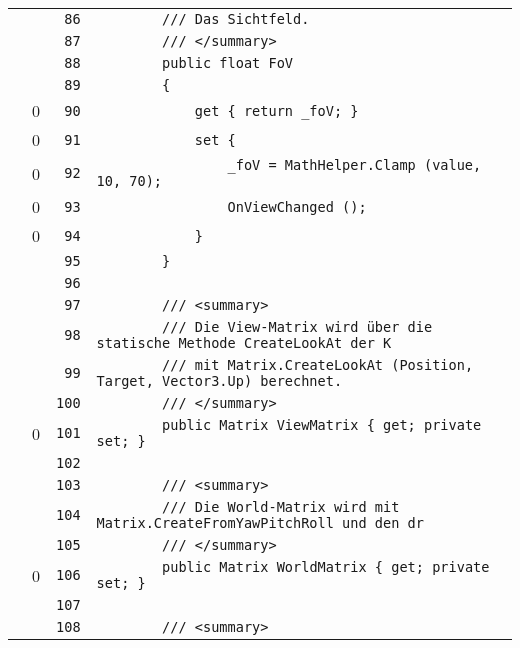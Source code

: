\documentclass[a4paper,10pt]{article}
\begin{document}
\begin{longtable}[l]{lrrl}
\cellcolor{gray} &  & \verb~86~ & \verb~        /// Das Sichtfeld.~\\
\cellcolor{gray} &  & \verb~87~ & \verb~        /// </summary>~\\
\cellcolor{gray} &  & \verb~88~ & \verb~        public float FoV~\\
\cellcolor{gray} &  & \verb~89~ & \verb~        {~\\
\cellcolor{red} & 0 & \verb~90~ & \verb~            get { return _foV; }~\\
\cellcolor{red} & 0 & \verb~91~ & \verb~            set {~\\
\cellcolor{red} & 0 & \verb~92~ & \verb~                _foV = MathHelper.Clamp (value, 10, 70);~\\
\cellcolor{red} & 0 & \verb~93~ & \verb~                OnViewChanged ();~\\
\cellcolor{red} & 0 & \verb~94~ & \verb~            }~\\
\cellcolor{gray} &  & \verb~95~ & \verb~        }~\\
\cellcolor{gray} &  & \verb~96~ & \verb~~\\
\cellcolor{gray} &  & \verb~97~ & \verb~        /// <summary>~\\
\cellcolor{gray} &  & \verb~98~ & \verb~        /// Die View-Matrix wird über die statische Methode CreateLookAt der K~\\
\cellcolor{gray} &  & \verb~99~ & \verb~        /// mit Matrix.CreateLookAt (Position, Target, Vector3.Up) berechnet.~\\
\cellcolor{gray} &  & \verb~100~ & \verb~        /// </summary>~\\
\cellcolor{red} & 0 & \verb~101~ & \verb~        public Matrix ViewMatrix { get; private set; }~\\
\cellcolor{gray} &  & \verb~102~ & \verb~~\\
\cellcolor{gray} &  & \verb~103~ & \verb~        /// <summary>~\\
\cellcolor{gray} &  & \verb~104~ & \verb~        /// Die World-Matrix wird mit Matrix.CreateFromYawPitchRoll und den dr~\\
\cellcolor{gray} &  & \verb~105~ & \verb~        /// </summary>~\\
\cellcolor{red} & 0 & \verb~106~ & \verb~        public Matrix WorldMatrix { get; private set; }~\\
\cellcolor{gray} &  & \verb~107~ & \verb~~\\
\cellcolor{gray} &  & \verb~108~ & \verb~        /// <summary>~\\

\end{longtable}
\end{document}
